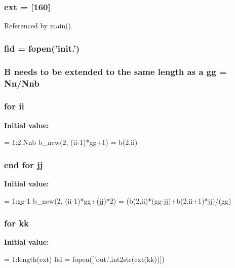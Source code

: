 \subsubsection[{ext}]{\setlength{\rightskip}{0pt plus 5cm}ext = [160]}\label{plotting_8m_a6215e022267dc11d572ec677098947ab}


Referenced by main().

\subsubsection[{fid}]{\setlength{\rightskip}{0pt plus 5cm}fid = fopen('init.')}\label{plotting_8m_ae9011d40c6f13e68e6f07156e0da7c5d}
\subsubsection[{gg}]{\setlength{\rightskip}{0pt plus 5cm}B needs to be extended to the same length as {\bf a} gg = {\bf Nn}/{\bf Nnb}}\label{plotting_8m_af0060062d8caa39f53e2d7e81d095ad5}
\subsubsection[{ii}]{\setlength{\rightskip}{0pt plus 5cm}for ii}\label{plotting_8m_abf9d47cd7d4fbc942e618bb1977019c2}
{\bfseries Initial value\-:}
\begin{DoxyCode}
= 1:2:Nnb
        b_new(2, (ii-1)*gg+1) = b(2,ii)
\end{DoxyCode}
\subsubsection[{jj}]{\setlength{\rightskip}{0pt plus 5cm}end for jj}\label{plotting_8m_a09df3fd26e78475d800584930b6bfeed}
{\bfseries Initial value\-:}
\begin{DoxyCode}
= 1:gg-1
            b_new(2, (ii-1)*gg+(jj)*2) = (b(2,ii)*(gg-jj)+b(2,ii+1)*jj)/(gg)
\end{DoxyCode}
\subsubsection[{kk}]{\setlength{\rightskip}{0pt plus 5cm}for kk}\label{plotting_8m_af29949bd63fb009eacab5efd11399e40}
{\bfseries Initial value\-:}
\begin{DoxyCode}
= 1:length(ext)
    fid = fopen(['out.',int2str(ext(kk))])
\end{DoxyCode}
